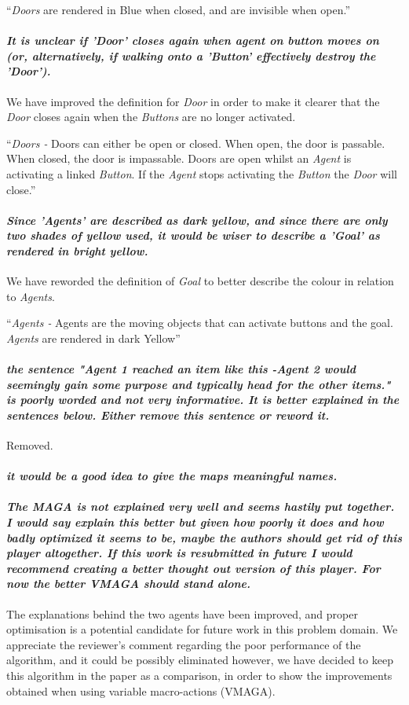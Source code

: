 \documentclass{article}
\begin{document}
``\emph{Doors} are rendered in Blue when closed, and are invisible when open.''
\paragraph*{\textit{It is unclear if 'Door' closes again when agent on button moves on (or, alternatively, if walking onto a 'Button' effectively destroy the 'Door').}}
We have improved the definition for \emph{Door} in order to make it clearer that the \emph{Door} closes again when the \emph{Buttons} are no longer activated.

``\emph{Doors -} Doors can either be open or closed. When open, the door is passable. When closed, the door is impassable. Doors are open whilst an \emph{Agent} is activating a linked \emph{Button}. If the \emph{Agent} stops activating the \emph{Button} the \emph{Door} will close.''
\paragraph*{\textit{Since 'Agents' are described as dark yellow, and since there are only two shades of yellow used, it would be wiser to describe a 'Goal' as rendered in bright yellow.}}
We have reworded the definition of \emph{Goal} to better describe the colour in relation to \emph{Agents}.

``\emph{Agents -} Agents are the moving objects that can activate buttons and the goal. \emph{Agents} are rendered in dark Yellow''
\paragraph*{\textit{the sentence "Agent 1 reached an item like this -Agent 2 would seemingly gain some purpose and typically head for the other items." is poorly worded and not very informative. It is better explained in the sentences below. Either remove this sentence or reword it.}}
Removed.

\paragraph*{\textit{it would be a good idea to give the maps meaningful names.}}
\paragraph*{\textit{The MAGA is not explained very well and seems hastily put together. I would say explain this better but given how poorly it does and how badly optimized it seems to be, maybe the authors should get rid of this player altogether. If this work is resubmitted in future I would recommend creating a better thought out version of this player. For now the better VMAGA should stand alone.
}}
The explanations behind the two agents have been improved, and proper optimisation is a potential candidate for future work in this problem domain. We appreciate the reviewer's comment regarding the poor performance of the algorithm, and it could be possibly eliminated however, we have decided to keep this algorithm in the paper as a comparison, in order to show the improvements obtained when using variable macro-actions (VMAGA).
\end{document}

